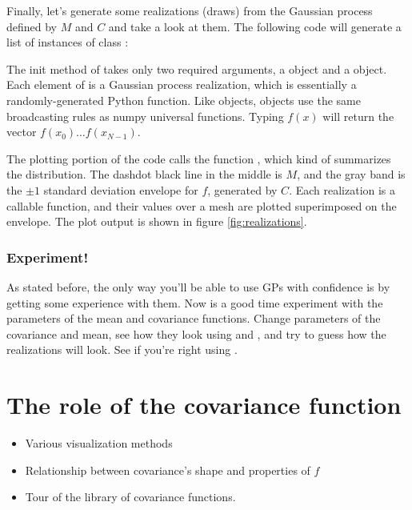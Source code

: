 \documentclass{manual}
\begin{document}
Finally, let's generate some realizations (draws) from the Gaussian process defined by $M$ and $C$ and take a look at them. The following code will generate a list of instances of class :


	The init method of  takes only two required arguments, a  object and a  object. Each element of  is a Gaussian process realization, which is essentially a randomly-generated Python function. Like  objects,  objects use the same broadcasting rules as numpy universal functions. Typing $f(x)$ will return the vector $f(x_0)\ldots f(x_{N-1})$.

The plotting portion of the code calls the function , which kind of summarizes the distribution. The dashdot black line in the middle is $M$, and the gray band is the $\pm 1$ standard deviation envelope for $f$, generated by $C$. Each realization is a callable function, and their values over a mesh are plotted superimposed on the envelope. The plot output is shown in figure \ref{fig:realizations}. 

\subsubsection{Experiment!} 

As stated before, the only way you'll be able to use GPs with confidence is by getting some experience with them. Now is a good time experiment with the parameters of the mean and covariance functions. Change parameters of the covariance and mean, see how they look using  and  , and try to guess how the realizations will look. See if you're right using .


\section{The role of the covariance function}\label{sec:cov} 

\begin{itemize}
	\item Various visualization methods
	\item Relationship between covariance's shape and properties of $f$
	\item Tour of the library of covariance functions.
\end{itemize}
\end{document}
